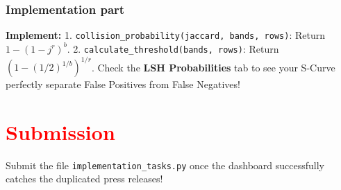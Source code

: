 \documentclass[11pt]{article}
\begin{document}
\subsubsection*{Implementation part}
\textbf{Implement:}
1. \lstinline|collision_probability(jaccard, bands, rows)|: Return $1 - (1 - j^r)^b$.
2. \lstinline|calculate_threshold(bands, rows)|: Return $(1 - (1/2)^{1/b})^{1/r}$.
Check the \textbf{LSH Probabilities} tab to see your S-Curve perfectly separate False Positives from False Negatives!

\section*{\textcolor{red}{Submission}}

Submit the file \texttt{implementation\_tasks.py} once the dashboard successfully catches the duplicated press releases!
\end{document}
